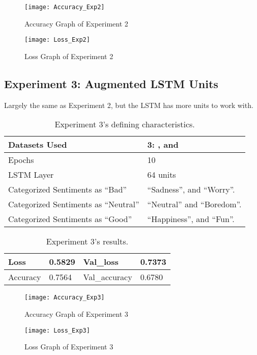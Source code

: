 \begin{figure}[!h]
	\centering
	\texttt{[image: Accuracy\_Exp2]}
	\caption{Accuracy Graph of Experiment 2}
	\label{fig:accuracy_exp2}
	\texttt{[image: Loss\_Exp2]}
	\caption{Loss Graph of Experiment 2}
	\label{fig:loss_exp2}
\end{figure}
\pagebreak

\subsection{Experiment 3: Augmented LSTM Units}
\label{exp3}
Largely the same as Experiment 2, but the LSTM has more units to work with.
\begin{table}[!th]
	\caption{Experiment 3's defining characteristics.}
	\vspace{0.5cm}
	\centering
	\begin{tabular}[t]{|l|l|}
	\hline
		Datasets Used & \makecell{3: \citet{d1}, \citet{d2} and\\ \citet{d3}}
	\\ \hline
		Epochs & 10
	\\ \hline
		LSTM Layer & 64 units
	\\ \hline
		Categorized Sentiments as ``Bad'' & ``Sadness'', and ``Worry''.
	\\ \hline	
		 Categorized Sentiments as ``Neutral'' & ``Neutral'' and ``Boredom''.
	\\ \hline	
		Categorized Sentiments as ``Good'' & ``Happiness'', and ``Fun''.
	\\ \hline
	\end{tabular}
\end{table}

\begin{table}[!bh]
	\caption{Experiment 3's results.}
	\vspace{0.5cm}
	\centering
	\begin{tabular}[t]{|l|l|l|l|}
	\hline
		Loss & 0.5829 & Val\_loss & 0.7373
	\\ \hline
		Accuracy & 0.7564 & Val\_accuracy & 0.6780
	\\ \hline
	\end{tabular}
\end{table}


\begin{figure}[!h]
	\centering
	\texttt{[image: Accuracy\_Exp3]}
	\caption{Accuracy Graph of Experiment 3}
	\label{fig:accuracy_exp3}
	\texttt{[image: Loss\_Exp3]}
	\caption{Loss Graph of Experiment 3}
	\label{fig:loss_exp3}
\end{figure}
\pagebreak

